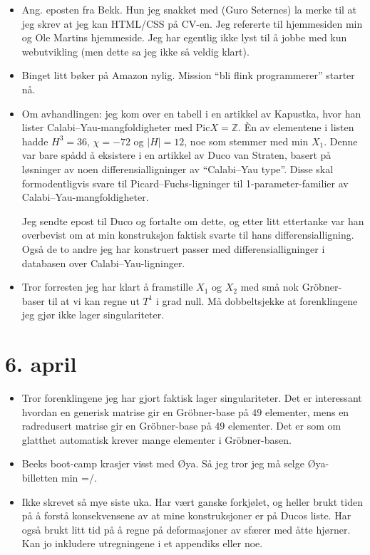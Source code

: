 \documentclass[11pt, norsk]{article}
\begin{document}
\begin{itemize}
  \item Ang. eposten fra Bekk. Hun jeg snakket med (Guro Seternes) la merke til at jeg skrev at jeg kan HTML/CSS på CV-en. Jeg refererte til hjemmesiden min og Ole Martins hjemmeside. Jeg har egentlig ikke lyst til å jobbe med kun webutvikling (men dette sa jeg ikke så veldig klart).
  \item Binget litt bøker på Amazon nylig. Mission ``bli flink programmerer'' starter nå.
  \item Om avhandlingen: jeg kom over en tabell i en artikkel av Kapustka, hvor han lister Calabi--Yau-mangfoldigheter med $\mathrm{Pic} X = \mathbb Z$. Èn av elementene i listen hadde $H^3=36$, $\chi=-72$ og $|H|=12$, noe som stemmer med min $X_1$. Denne var bare spådd å eksistere i en artikkel av Duco van Straten, basert på løsninger av noen differensialligninger av ``Calabi--Yau type''. Disse skal formodentligvis svare til Picard--Fuchs-ligninger til 1-parameter-familier av Calabi--Yau-mangfoldigheter.

  Jeg sendte epost til Duco og fortalte om dette, og etter litt ettertanke var han overbevist om at min konstruksjon faktisk svarte til hans differensialligning. Også de to andre jeg har konstruert passer med differensialligninger i databasen over Calabi--Yau-ligninger.
  \item Tror forresten jeg har klart å framstille $X_1$ og $X_2$ med små nok Gröbner-baser til at vi kan regne ut $T^1$ i grad null. Må dobbeltsjekke at forenklingene jeg gjør ikke lager singulariteter.
\end{itemize}


\section{6. april} %
\label{sec:6_april}

\begin{itemize}
  \item Tror forenklingene jeg har gjort faktisk lager singulariteter. Det er interessant hvordan en generisk matrise gir en Gröbner-base på $49$ elementer, mens en radredusert matrise gir en Gröbner-base på $49$ elementer. Det er som om glatthet automatisk krever mange elementer i Gröbner-basen.
  \item Beeks boot-camp krasjer visst med Øya. Så jeg tror jeg må selge Øya-billetten min =/.
  \item Ikke skrevet så mye siste uka. Har vært ganske forkjølet, og heller brukt tiden på å forstå konsekvensene av at mine konstruksjoner er på Ducos liste. Har også brukt litt tid på å regne på deformasjoner av sfærer med åtte hjørner. Kan jo inkludere utregningene i et appendiks eller noe.
\end{itemize}

\end{document}
